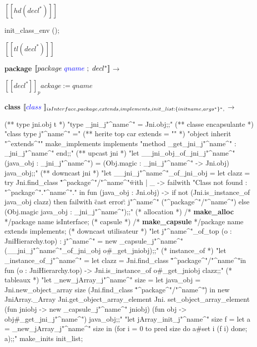 \documentclass[a4paper, 11pt]{report}
\newcommand{\fun}[1]{\ttfamily\textbf{#1}}
\begin{document}
$[\![ hd(decl^*) ]\!]$
\begin{OCaml}
   init_class_env ();
\end{OCaml} 

$[\![ tl(decl^*) ]\!]$ 
\newline
\ 
\newline

\textbf{package}
\newline
\noindent
$[\![ package\ {\color{blue}qname}\ ;\ decl^* ]\!]$$\longrightarrow$

$[\![ decl^* ]\!]_package:=qname$ 
\newline
\ 
\newline

\textbf{class}
\newline
\noindent
$[\![ {\color{blue}class}\ ]\!]_{isInterface, package, extends, implements, init\_list:\{initname, args^*\}^*, }$$\longrightarrow$
\begin{OCaml}
(** type jni.obj t *)
"type _jni_j"^name^" = Jni.obj;;"
(** classe encapsulante *)
"class type j"^name^" ="
(** herite top car extends = "" *)
   "object inherit "^extends^""
    make_implements implements
   "method _get_jni_j"^name^" : _jni_j"^name^"
   end;;"
(** upcast jni *)
"let __jni_obj_of_jni_j"^name^" (java_obj : _jni_j"^name^") =
   (Obj.magic : _jni_j"^name^" -> Jni.obj) java_obj;;"
(** downcast jni *)
"let __jni_j"^name^"_of_jni_obj =
   let clazz =
      try Jni.find_class \""^package^"/"^name^"\"
   with | _ -> failwith "Class not found : "^package^"."^name^"."
   in
      fun (java_obj : Jni.obj) ->
        if not (Jni.is_instance_of java_obj clazz)
        then failwith \"cast error\" : j"^name^" ("^package^"/"^name^")
        else (Obj.magic java_obj : _jni_j"^name^");;"
(* allocation *)
/* \fun{make\_alloc} */package name isInterface;
(* capsule *)
/* \fun{make\_capsule} */package name extends implements;
(* downcast utilisateur *)
"let j"^name^"_of_top (o : JniHierarchy.top) : j"^name^" =
    new _capsule_j"^name^" (__jni_j"^name^"_of_jni_obj o#_get_jniobj);;"
(* instance_of *)
"let _instance_of_j"^name^" =
   let clazz = Jni.find_class \""^package^"/"^name^"\"
    in fun (o : JniHierarchy.top) -> Jni.is_instance_of o#_get_jniobj clazz;;"
(* tableaux *)
"let _new_jArray_j"^name^" size =
    let java_obj = Jni.new_object_array size (Jni.find_class \""^package^"/"^name^"\")
    in
      new JniArray._Array Jni.get_object_array_element Jni.
        set_object_array_element (fun jniobj -> new _capsule_j"^name^" jniobj)
        (fun obj -> obj#_get_jni_j"^name^") java_obj;;"
"let jArray_init_j"^name^" size f =
    let a = _new_jArray_j"^name^" size
    in (for i = 0 to pred size do a#set i (f i) done; a);;"
make_inits init_list;
\end{OCaml}
\end{document}
